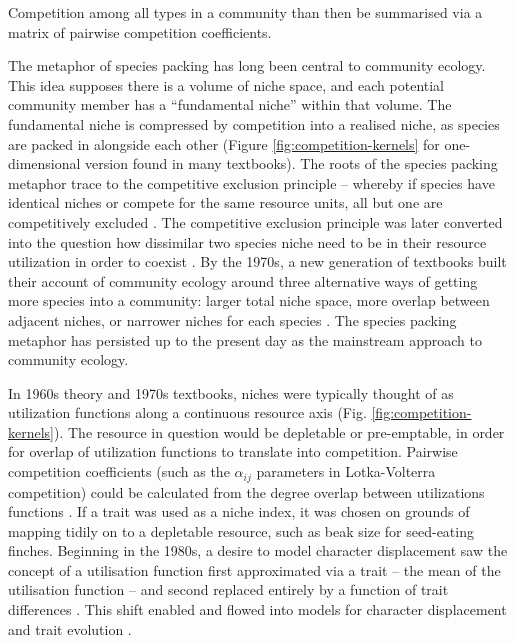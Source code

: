 
Competition among all types in a community than then be summarised via a matrix of pairwise competition coefficients.

The metaphor of species packing has long been central to community ecology.
This idea supposes there is a volume of niche space, and each potential community member has a ``fundamental niche'' within that volume.
The fundamental niche is compressed by competition into a realised niche, as species are packed in alongside each other (Figure \ref{fig:competition-kernels} for one-dimensional version found in many textbooks).
%
The roots of the species packing metaphor trace to the competitive exclusion principle -- whereby if species have identical niches or compete for the same resource units, all but one are competitively excluded \citep{Lotka-1925, Volterra-1926, Gause-1934}.
The competitive exclusion principle was later converted into the question how dissimilar two species niche need to be in their resource utilization in order to coexist \citep{MacArthur-1967, May-1972, Slatkin-1980}.
%
By the 1970s, a new generation of textbooks built their account of community ecology around three alternative ways of getting more species into a community: larger total niche space, more overlap between adjacent niches, or narrower niches for each species \citep{Whittaker-1970,Krebs-1972,Ricklefs-1973,Pianka-1974}. The species packing metaphor has persisted up to the present day as the mainstream approach to community ecology.

In 1960s theory and 1970s textbooks, niches were typically thought of as utilization functions along a continuous resource axis\citep{MacArthur-1967,Abrams-1975} (Fig. \ref{fig:competition-kernels}).
The resource in question would be depletable or pre-emptable, in order for overlap of utilization functions to translate into competition. Pairwise competition coefficients (such as the $\alpha_{ij}$ parameters in Lotka-Volterra competition) could be calculated from the degree overlap between utilizations functions \citep{MacArthur-1967, May-1972, Abrams-1975}.
If a trait was used as a niche index, it was chosen on grounds of mapping tidily on to a depletable resource, such as beak size for seed-eating finches.
Beginning in the 1980s, a desire to model character displacement saw the concept of a utilisation function first approximated via a trait -- the mean of the utilisation function 
\citep{Roughgarden-1979} -- and second replaced entirely by a function of trait differences \citep{Slatkin-1980,Taper-1985}. 
This shift enabled and flowed into models for character displacement \citep[e.g.,][]{Taper-1985, Case-2000, Goldberg-2006} and trait evolution \citep{Brown-1987,Geritz-1998,Geritz-1999,Dieckmann-1999,  Abrams-2001}.


